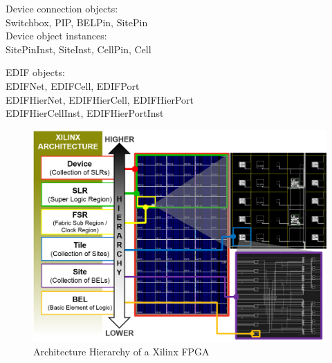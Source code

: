 \documentclass{article}
\begin{document}
    Device connection objects: \\
        Switchbox, PIP, BELPin, SitePin \\

    Device object instances: \\
        SitePinInst, SiteInst, CellPin, Cell

    EDIF objects: \\
        EDIFNet, EDIFCell, EDIFPort \\
        EDIFHierNet, EDIFHierCell, EDIFHierPort \\
        EDIFHierCellInst, EDIFHierPortInst \\

\begin{figure}
    \centering
    \includegraphics[width=\textwidth]{figures/hierarchy.png}
    \caption{Architecture Hierarchy of a Xilinx FPGA}\label{fig:hierarchy}
\end{figure}
\end{document}
